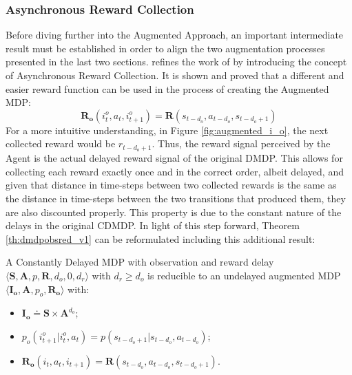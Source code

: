             \subsubsection{Asynchronous Reward Collection}
                Before diving further into the Augmented Approach, an important intermediate result must be established in order to align the two augmentation processes presented in the last two sections.  refines the work of  by introducing the concept of Asynchronous Reward Collection. It is shown and proved that a different and easier reward function can be used in the process of creating the Augmented MDP:
                \[ \mathbf{R_{o}}\left( i^o_t, a_{t}, i^o_{t+1} \right) = \mathbf{R}\left(s_{t-d_{o}}, a_{t-d_{o}}, s_{t-d_{o}+1} \right)\]
                For a more intuitive understanding, in Figure \ref{fig:augmented_i_o}, the next collected reward would be $r_{t-d_{o}+1}$. Thus, the reward signal perceived by the Agent is the actual delayed reward signal of the original DMDP. This allows for collecting each reward exactly once and in the correct order, albeit delayed, and given that distance in time-steps between two collected rewards is the same as the distance in time-steps between the two transitions that produced them, they are also discounted properly. This property is due to the constant nature of the delays in the original CDMDP. In light of this step forward, Theorem \ref{th:dmdpobsred_v1} can be reformulated including this additional result:
                
                \begin{theorem}
                    \label{th:dmdpobsred_v2}
                    A Constantly Delayed MDP with observation and reward delay $\langle \mathbf{S}, \mathbf{A}, p, \mathbf{R}, d_o, 0, d_r \rangle$ with $d_r \geq d_o$ is reducible to an undelayed augmented MDP $\langle \mathbf{I_o}, \mathbf{A}, p_o, \mathbf{R_o} \rangle$ with: 
                    \begin{itemize}[topsep=0.5em, partopsep=0.5em]
                        \setlength\itemsep{0em}
                        \item $\mathbf{I_{o}} \doteq \mathbf{S} \times \mathbf{A}^{d_o}$;
                        \item $p_o \left( i_{t+1}^o | i_t^o , a_t  \right) = p ( s_{t-d_{o}+1} | s_{t-d_{o}}, a_{t-d_{o}})$;
                        \item $\mathbf{R_{o}}\left( i_t, a_{t}, i_{t+1} \right) = \mathbf{R}\left(s_{t-d_{o}}, a_{t-d_{o}}, s_{t-d_{o}+1} \right)$.
                    \end{itemize}
                \end{theorem}
                
